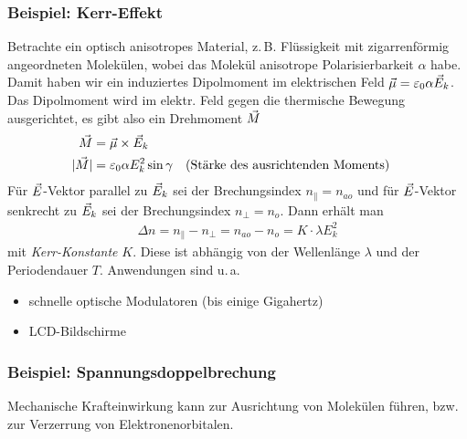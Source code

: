 \subsubsection{Beispiel: Kerr-Effekt}
Betrachte ein optisch anisotropes Material, z.\,B. Flüssigkeit mit
zigarrenförmig angeordneten Molekülen, wobei das Molekül anisotrope
Polarisierbarkeit $\alpha$ habe.
Damit haben wir ein induziertes Dipolmoment im elektrischen Feld
$\vec{\mu} = \varepsilon_0\alpha\vec{E}_k$.
Das Dipolmoment wird im elektr. Feld gegen die thermische Bewegung
ausgerichtet, es gibt also ein Drehmoment
$\vec{M}$
\begin{align*}
  \vec{M} &= \vec{\mu}\times \vec{E}_k\\
  |\vec{M}| &= \varepsilon_0\alpha E_k^2\sin\gamma 
          &&\text{(Stärke des ausrichtenden Moments)}
\end{align*}
Für $\vec{E}$-Vektor parallel zu $\vec{E}_k$ sei der
Brechungsindex $n_\parallel=n_{ao}$ und für
$\vec{E}$-Vektor senkrecht zu $\vec{E}_k$ sei der
Brechungsindex $n_\bot=n_{o}$. Dann erhält man
\begin{gather*}
  \Delta n = n_\parallel - n_\bot = n_{ao}-n_o =
  K\cdot \lambda E_k^2
\end{gather*}%
%
mit \emph{Kerr-Konstante} $K$.
Diese ist abhängig von der Wellenlänge $\lambda$ und der Periodendauer
$T$.
Anwendungen sind u.\,a.
\begin{itemize}
\item schnelle optische Modulatoren (bis einige Gigahertz)
\item LCD-Bildschirme
\end{itemize}

\subsubsection{Beispiel: Spannungsdoppelbrechung}
Mechanische Krafteinwirkung kann zur Ausrichtung von Molekülen
führen, bzw. zur Verzerrung von Elektronenorbitalen.



